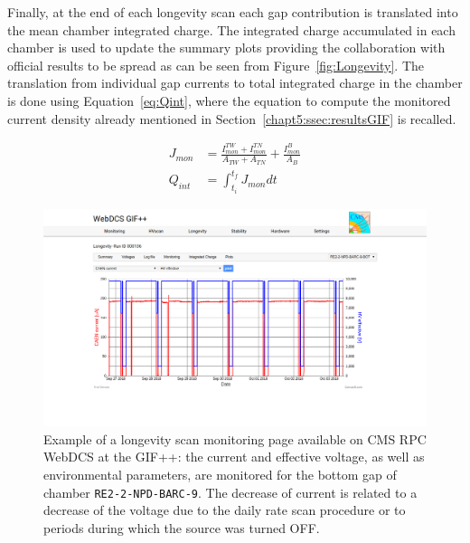 	Finally, at the end of each longevity scan each gap contribution is translated into the mean chamber integrated charge. The integrated charge accumulated in each chamber is used to update the summary plots providing the collaboration with official results to be spread as can be seen from Figure~\ref{fig:Longevity}. The translation from individual gap currents to total integrated charge in the chamber is done using Equation~\ref{eq:Qint}, where the equation to compute the monitored current density already mentioned in Section~\ref{chapt5:ssec:resultsGIF} is recalled.
	
	\begin{equation}
	\label{eq:Qint}
		\begin{aligned}
	J_{mon} &= \frac{I_{mon}^{TW}+I_{mon}^{TN}}{A_{TW}+A_{TN}} + \frac{I_{mon}^B}{A_B}\\
	Q_{int} &= \int_{t_i}^{t_f} J_{mon}dt
		\end{aligned}
	\end{equation}
	
\newpage
	
	\begin{figure}[H]
        \centering
		\includegraphics[width = \linewidth]{fig/chapt5/Longevity-scan-I-HVeff-vs-Time.png}
		\caption{\label{fig:DQM-Longevity-Monitoring} Example of a longevity scan monitoring page available on CMS RPC WebDCS at the GIF++: the current and effective voltage, as well as environmental parameters, are monitored for the bottom gap of chamber \texttt{RE2-2-NPD-BARC-9}. The decrease of current is related to a decrease of the voltage due to the daily rate scan procedure or to periods during which the source was turned OFF.}
	\end{figure}
	
